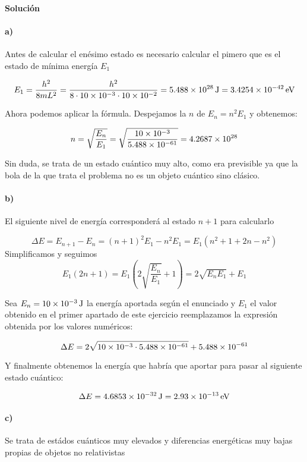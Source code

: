 \documentclass[12pt, a4paper]{article}
\begin{document}
    \paragraph{\textbf{Solución}}
    \paragraph{a)} Antes de calcular el enésimo estado es necesario calcular el pimero que es el estado
    de mínima energía $E_1$

    $$E_1=\frac{h^2}{8mL^2} = \frac{h^2}{8\cdot\num{10d-3}\cdot\num{10d-2}} = \SI{5.488d28}{\J} = \SI{3.4254d-42}{\electronvolt}$$

    Ahora podemos aplicar la fórmula. Despejamos la $n$ de $E_n = n^2 E_1$ y obtenemos:

    $$n = \sqrt{\frac{E_n}{E_1}} = \sqrt{\frac{\num{10d-3}}{\num{5.488d-61}}} = \num{4.2687d28}$$

    Sin duda, se trata de un estado cuántico muy alto, como era previsible ya que la bola de la
    que trata el problema no es un objeto cuántico sino clásico.

    \paragraph{b)} El siguiente nivel de energía corresponderá al estado $n+1$ para calcularlo

    $$\Delta E = E_{n+1}-E_n = (n+1)^2 E_1 - n^2 E_1=
    E_1(n^2+1+2n-n^2) $$
    Simplificamos y seguimos
    $$E_1(2n+1) = E_1\left(2 \sqrt{\frac{E_n}{E_1}}+1\right) = 2\sqrt{E_nE_1}+E_1$$

    Sea $E_n = \SI{10d-3}{\J}$ la energía aportada según el enunciado y $E_1$ el valor
    obtenido en el primer apartado de este ejercicio reemplazamos la expresión obtenida
    por los valores numéricos:

    $$\Delta E = 2 \sqrt{\num{10d-3} \cdot \num{5.488d-61}} + \num{5.488d-61}$$

    Y finalmente obtenemos la energía que habría que aportar para pasar al siguiente
    estado cuántico:

    $$\Delta E = \SI{4.6853d-32}{\J} = \SI{2.93d-13}{\electronvolt}$$

    \paragraph{c)} Se trata de estádos cuánticos muy elevados y diferencias energéticas muy
    bajas propias de objetos no relativistas
\end{document}
